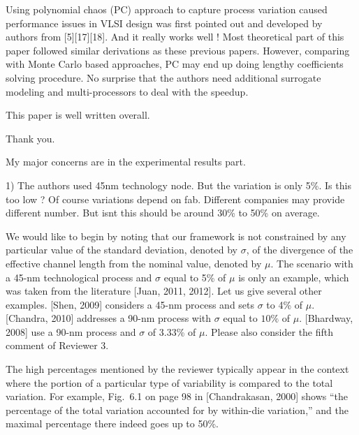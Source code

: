 \begin{reviewer}
Using polynomial chaos (PC) approach to capture process variation caused performance issues in VLSI design was first pointed out and developed by authors from [5][17][18]. And it really works well ! Most theoretical part of this paper followed similar derivations as these previous papers. However, comparing with Monte Carlo based approaches, PC may end up doing  lengthy  coefficients solving procedure. No surprise that the authors need additional surrogate modeling and multi-processors to deal with the speedup.

This paper is well written overall.
\end{reviewer}
\begin{authors}
Thank you.
\end{authors}

\begin{reviewer}
My major concerns are in the experimental results part.

1) The authors used 45nm technology node. But the variation is only 5\%. Is this too low ? Of course variations depend on fab. Different companies may provide different number. But isnt this should be around 30\% to 50\% on average.
\end{reviewer}
\begin{authors}
We would like to begin by noting that our framework is not constrained by any particular value of the standard deviation, denoted by $\sigma$, of the divergence of the effective channel length from the nominal value, denoted by $\mu$.
The scenario with a 45-nm technological process and $\sigma$ equal to 5\% of $\mu$ is only an example, which was taken from the literature [Juan, 2011, 2012].
Let us give several other examples.
[Shen, 2009] considers a 45-nm process and sets $\sigma$ to 4\% of $\mu$.
[Chandra, 2010] addresses a 90-nm process with $\sigma$ equal to $10\%$ of $\mu$.
[Bhardway, 2008] use a 90-nm process and $\sigma$ of 3.33\% of $\mu$.
Please also consider the fifth comment of Reviewer 3.

The high percentages mentioned by the reviewer typically appear in the context where the portion of a particular type of variability is compared to the total variation.
For example, Fig.~6.1 on page 98 in [Chandrakasan, 2000] shows ``the percentage of the total variation accounted for by within-die variation,'' and the maximal percentage there indeed goes up to 50\%.

\begin{actions}
\end{actions}
\end{authors}

